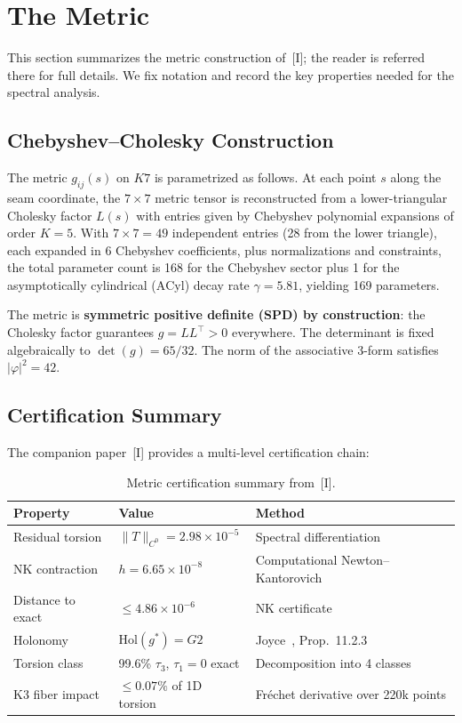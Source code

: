 \documentclass[11pt,a4paper]{article}
\newcommand{\Gtwo}{\mathrm{G}_2}
\newcommand{\Kseven}{K_7}
\newcommand{\Hol}{\mathrm{Hol}}
\newcommand{\ACyl}{\mathrm{ACyl}}
\theoremstyle{remark}
\def\Gtwo{G2}%
\def\Kseven{K7}%
\begin{document}
\section{The Metric}

This section summarizes the metric construction of~[I]; the reader is referred there
for full details. We fix notation and record the key properties needed for the
spectral analysis.

\subsection{Chebyshev--Cholesky Construction}

The metric $g_{ij}(s)$ on $\Kseven$ is parametrized as follows. At each point $s$ along the
seam coordinate, the $7 \times 7$ metric tensor is reconstructed from a lower-triangular
Cholesky factor $L(s)$ with entries given by Chebyshev polynomial expansions of order
$K = 5$. With $7 \times 7 = 49$ independent entries (28 from the lower triangle), each
expanded in 6 Chebyshev coefficients, plus normalizations and constraints, the total
parameter count is 168 for the Chebyshev sector plus 1 for the asymptotically
cylindrical ($\ACyl$) decay rate $\gamma = 5.81$, yielding 169 parameters.

The metric is \textbf{symmetric positive definite (SPD) by construction}: the Cholesky
factor guarantees $g = LL^\top > 0$ everywhere. The determinant is fixed algebraically
to $\det(g) = 65/32$. The norm of the associative 3-form satisfies $|\varphi|^2 = 42$.

\subsection{Certification Summary}

The companion paper~[I] provides a multi-level certification chain:

\begin{table}[htbp]
\centering
\begin{tabular}{lll}
\toprule
Property & Value & Method \\
\midrule
Residual torsion & $\|T\|_{C^0} = 2.98 \times 10^{-5}$ & Spectral differentiation \\
NK contraction & $h = 6.65 \times 10^{-8}$ & Computational Newton--Kantorovich \\
Distance to exact & $\leq 4.86 \times 10^{-6}$ & NK certificate \\
Holonomy & $\Hol(g^*) = \Gtwo$ & Joyce~\cite{ref6}, Prop.~11.2.3 \\
Torsion class & 99.6\% $\tau_3$, $\tau_1 = 0$ exact & Decomposition into 4 classes \\
K3 fiber impact & $\leq 0.07\%$ of 1D torsion & Fr\'echet derivative over 220k points \\
\bottomrule
\end{tabular}
\caption{Metric certification summary from~[I].}
\label{tab:certification}
\end{table}
\end{document}

